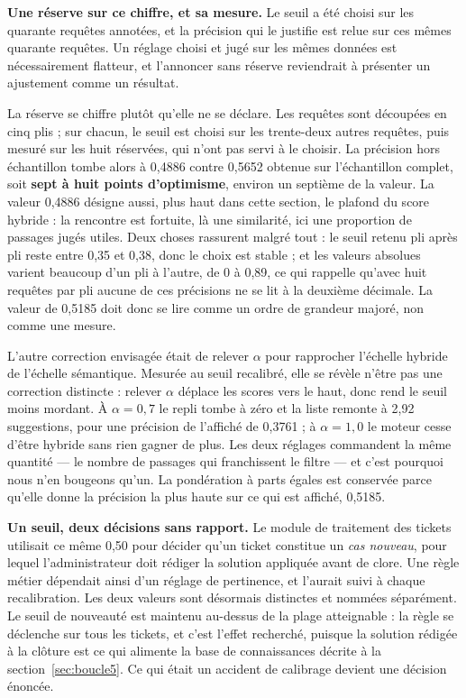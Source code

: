 \textbf{Une réserve sur ce chiffre, et sa mesure.} Le seuil a été choisi sur les quarante requêtes
annotées, et la précision qui le justifie est relue sur ces mêmes quarante requêtes. Un réglage
choisi et jugé sur les mêmes données est nécessairement flatteur, et l'annoncer sans réserve
reviendrait à présenter un ajustement comme un résultat.

La réserve se chiffre plutôt qu'elle ne se déclare. Les requêtes sont découpées en cinq plis ; sur
chacun, le seuil est choisi sur les trente-deux autres requêtes, puis mesuré sur les huit
réservées, qui n'ont pas servi à le choisir. La précision hors échantillon tombe alors à 0,4886
contre 0,5652 obtenue sur l'échantillon complet, soit \textbf{sept à huit points d'optimisme},
environ un septième de la valeur. La valeur 0,4886 désigne aussi, plus haut dans cette section, le
plafond du score hybride : la rencontre est fortuite, là une similarité, ici une proportion de
passages jugés utiles. Deux choses rassurent malgré tout : le seuil retenu pli après pli
reste entre 0,35 et 0,38, donc le choix est stable ; et les valeurs absolues varient beaucoup d'un
pli à l'autre, de 0 à 0,89, ce qui rappelle qu'avec huit requêtes par pli aucune de ces précisions
ne se lit à la deuxième décimale. La valeur de 0,5185 doit donc se lire comme un ordre de grandeur
majoré, non comme une mesure.

L'autre correction envisagée était de relever $\alpha$ pour rapprocher l'échelle hybride de
l'échelle sémantique. Mesurée au seuil recalibré, elle se révèle n'être pas une correction
distincte : relever $\alpha$ déplace les scores vers le haut, donc rend le seuil moins mordant. À
$\alpha = 0{,}7$ le repli tombe à zéro et la liste remonte à 2,92 suggestions, pour une précision
de l'affiché de 0,3761 ; à $\alpha = 1{,}0$ le moteur cesse d'être hybride sans rien gagner de
plus. Les deux réglages commandent la même quantité — le nombre de passages qui franchissent le
filtre — et c'est pourquoi nous n'en bougeons qu'un. La pondération à parts égales est conservée
parce qu'elle donne la précision la plus haute sur ce qui est affiché, 0,5185.

\textbf{Un seuil, deux décisions sans rapport.} Le module de traitement des tickets utilisait ce
même 0,50 pour décider qu'un ticket constitue un \emph{cas nouveau}, pour lequel l'administrateur
doit rédiger la solution appliquée avant de clore. Une règle métier dépendait ainsi d'un réglage de
pertinence, et l'aurait suivi à chaque recalibration. Les deux valeurs sont désormais distinctes et
nommées séparément. Le seuil de nouveauté est maintenu au-dessus de la plage atteignable : la règle
se déclenche sur tous les tickets, et c'est l'effet recherché, puisque la solution rédigée à la
clôture est ce qui alimente la base de connaissances décrite à la section~\ref{sec:boucle5}. Ce qui
était un accident de calibrage devient une décision énoncée.

